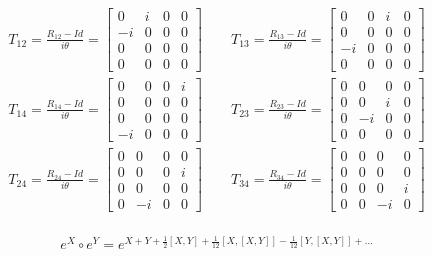 \documentclass{tstextbook}
\begin{document}
\begin{example}
\begin{gather*}T_{12}= \frac{R_{12} - Id}{i\theta } = \left[\begin{matrix}0 & i & 0 & 0\\- i & 0 & 0 & 0\\0 & 0 & 0 & 0\\0 & 0 & 0 & 0\end{matrix}\right] \qquad T_{13}= \frac{R_{13} - Id}{i\theta } = \left[\begin{matrix}0 & 0 & i & 0\\0 & 0 & 0 & 0\\- i & 0 & 0 & 0\\0 & 0 & 0 & 0\end{matrix}\right]\\T_{14}= \frac{R_{14} - Id}{i\theta } = \left[\begin{matrix}0 & 0 & 0 & i\\0 & 0 & 0 & 0\\0 & 0 & 0 & 0\\- i & 0 & 0 & 0\end{matrix}\right] \qquad T_{23}= \frac{R_{23} - Id}{i\theta } = \left[\begin{matrix}0 & 0 & 0 & 0\\0 & 0 & i & 0\\0 & - i & 0 & 0\\0 & 0 & 0 & 0\end{matrix}\right]\\T_{24}= \frac{R_{24} - Id}{i\theta} = \left[\begin{matrix}0 & 0 & 0 & 0\\0 & 0 & 0 & i\\0 & 0 & 0 & 0\\0 & - i & 0 & 0\end{matrix}\right]\qquad T_{34}= \frac{R_{34} - Id}{i\theta} = \left[\begin{matrix}0 & 0 & 0 & 0\\0 & 0 & 0 & 0\\0 & 0 & 0 & i\\0 & 0 & - i & 0\end{matrix}\right]\\
\end{gather*}

\end{example}
\begin{proposition}
$$e^{X}\circ e^ {Y}=e^{X+Y+{\frac{1}{2}}[X,Y]+{\frac{1}{12}}[X,[X,Y]]-{\frac{1}{12}}[Y,[X,Y]]+\ldots}$$

\end{proposition}
\end{document}
